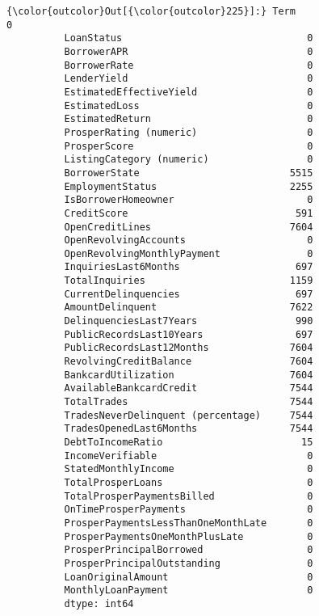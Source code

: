 \documentclass[11pt]{article}
\begin{document}
\begin{Verbatim}[commandchars=\\\{\}]
{\color{outcolor}Out[{\color{outcolor}225}]:} Term                                      0
          LoanStatus                                0
          BorrowerAPR                               0
          BorrowerRate                              0
          LenderYield                               0
          EstimatedEffectiveYield                   0
          EstimatedLoss                             0
          EstimatedReturn                           0
          ProsperRating (numeric)                   0
          ProsperScore                              0
          ListingCategory (numeric)                 0
          BorrowerState                          5515
          EmploymentStatus                       2255
          IsBorrowerHomeowner                       0
          CreditScore                             591
          OpenCreditLines                        7604
          OpenRevolvingAccounts                     0
          OpenRevolvingMonthlyPayment               0
          InquiriesLast6Months                    697
          TotalInquiries                         1159
          CurrentDelinquencies                    697
          AmountDelinquent                       7622
          DelinquenciesLast7Years                 990
          PublicRecordsLast10Years                697
          PublicRecordsLast12Months              7604
          RevolvingCreditBalance                 7604
          BankcardUtilization                    7604
          AvailableBankcardCredit                7544
          TotalTrades                            7544
          TradesNeverDelinquent (percentage)     7544
          TradesOpenedLast6Months                7544
          DebtToIncomeRatio                        15
          IncomeVerifiable                          0
          StatedMonthlyIncome                       0
          TotalProsperLoans                         0
          TotalProsperPaymentsBilled                0
          OnTimeProsperPayments                     0
          ProsperPaymentsLessThanOneMonthLate       0
          ProsperPaymentsOneMonthPlusLate           0
          ProsperPrincipalBorrowed                  0
          ProsperPrincipalOutstanding               0
          LoanOriginalAmount                        0
          MonthlyLoanPayment                        0
          dtype: int64
\end{Verbatim}
            
\end{document}
